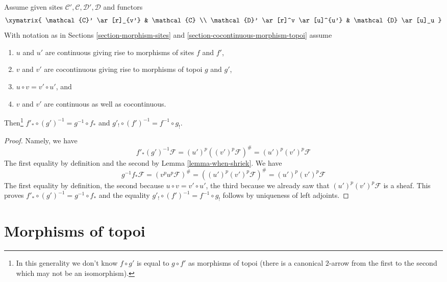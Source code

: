 \begin{lemma}
\label{lemma-special-square-continuous}
Assume given sites $\mathcal{C}', \mathcal{C}, \mathcal{D}', \mathcal{D}$
and functors
$$
\xymatrix{
\mathcal{C}' \ar[r]_{v'} &
\mathcal{C} \\
\mathcal{D}' \ar[r]^v \ar[u]^{u'} &
\mathcal{D} \ar[u]_u
}
$$
With notation as in Sections \ref{section-morphism-sites}
and \ref{section-cocontinuous-morphism-topoi} assume
\begin{enumerate}
\item $u$ and $u'$ are continuous giving rise to morphisms of
sites $f$ and $f'$,
\item $v$ and $v'$ are cocontinuous giving rise to morphisms
of topoi $g$ and $g'$,
\item $u \circ v = v' \circ u'$, and
\item $v$ and $v'$ are continuous as well as cocontinuous.
\end{enumerate}
Then\footnote{In this generality
we don't know $f \circ g'$ is equal to $g \circ f'$
as morphisms of topoi (there is a canonical $2$-arrow from
the first to the second which may not be an isomorphism).}
$f'_* \circ (g')^{-1} = g^{-1} \circ f_*$ and
$g'_! \circ (f')^{-1} = f^{-1} \circ g_!$.
\end{lemma}

\begin{proof}
Namely, we have
$$
f'_*(g')^{-1}\mathcal{F} = (u')^p((v')^p\mathcal{F})^\# =
(u')^p(v')^p\mathcal{F}
$$
The first equality by definition and the
second by Lemma \ref{lemma-when-shriek}. We have
$$
g^{-1}f_*\mathcal{F} = (v^pu^p\mathcal{F})^\# =
((u')^p(v')^p\mathcal{F})^\# = (u')^p(v')^p\mathcal{F}
$$
The first equality by definition, the second because
$u \circ v = v' \circ u'$, the third because we already saw that
$(u')^p(v')^p\mathcal{F}$ is a sheaf. This proves
$f'_* \circ (g')^{-1} = g^{-1} \circ f_*$ and the equality
$g'_! \circ (f')^{-1} = f^{-1} \circ g_!$ follows by
uniqueness of left adjoints.
\end{proof}
















\section{Morphisms of topoi}
\label{section-morphisms-topoi}

